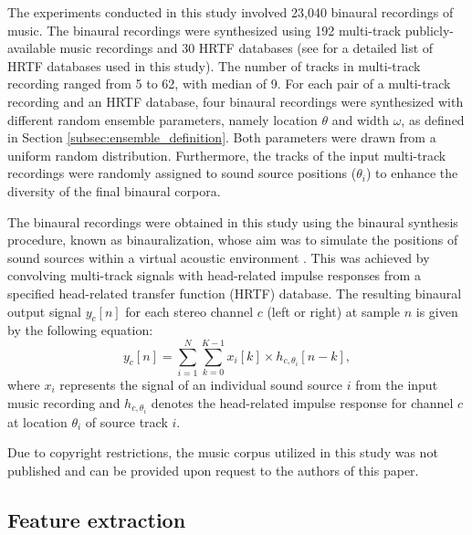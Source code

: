 \documentclass{article}
\begin{document}
The experiments conducted in this study involved 23,040 binaural recordings of music. The binaural recordings were synthesized using 192 multi-track publicly-available music recordings \cite{noauthor_mixing_nodate} and 30 HRTF databases (see  for a detailed list of HRTF databases used in this study). The number of tracks in multi-track recording ranged from 5 to 62, with median of 9. For each pair of a multi-track recording and an HRTF database, four binaural recordings were synthesized with different random ensemble parameters, namely location $\theta$ and width $\omega$, as defined in Section \ref{subsec:ensemble_definition}. Both parameters were drawn from a uniform random distribution. Furthermore, the tracks of the input multi-track recordings were randomly assigned to sound source positions ($\theta_i$) to enhance the diversity of the final binaural corpora.

The binaural recordings were obtained in this study using the binaural synthesis procedure, known as binauralization, whose aim was to simulate the positions of sound sources within a virtual acoustic environment \cite{blauert_spatial_1996}. This was achieved by convolving multi-track signals with head-related impulse responses from a specified head-related transfer function (HRTF) database. The resulting binaural output signal $y_c[n]$ for each stereo channel $c$ (left or right) at sample $n$ is given by the following equation:
\begin{equation}
  y_c[n] = \sum_{i=1}^{N} \sum_{k=0}^{K-1} x_i[k] \times h_{c,\theta_i}[n-k] ,
\end{equation}
where $x_i$ represents the signal of an individual sound source $i$ from the input music recording and $h_{c,\theta_i}$ denotes the head-related impulse response for channel $c$ at location $\theta_i$ of source track $i$.

Due to copyright restrictions, the music corpus utilized in this study was not published and can be provided upon request to the authors of this paper.

\subsection{Feature extraction}
\label{subsec:feature_extraction}


\end{document}
